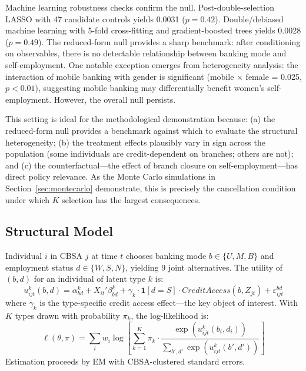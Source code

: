 \documentclass[12pt]{article}
\begin{document}
Machine learning robustness checks confirm the null. Post-double-selection LASSO \citep{belloni2014} with 47 candidate controls yields 0.0031 ($p = 0.42$). Double/debiased machine learning \citep{chernozhukov2018dml} with 5-fold cross-fitting and gradient-boosted trees yields 0.0028 ($p = 0.49$). The reduced-form null provides a sharp benchmark: after conditioning on observables, there is no detectable relationship between banking mode and self-employment. One notable exception emerges from heterogeneity analysis: the interaction of mobile banking with gender is significant (mobile $\times$ female = 0.025, $p < 0.01$), suggesting mobile banking may differentially benefit women's self-employment. However, the overall null persists.

This setting is ideal for the methodological demonstration because: (a) the reduced-form null provides a benchmark against which to evaluate the structural heterogeneity; (b) the treatment effects plausibly vary in sign across the population (some individuals are credit-dependent on branches; others are not); and (c) the counterfactual---the effect of branch closure on self-employment---has direct policy relevance. As the Monte Carlo simulations in Section~\ref{sec:montecarlo} demonstrate, this is precisely the cancellation condition under which $K$ selection has the largest consequences.

\subsection{Structural Model}

Individual $i$ in CBSA $j$ at time $t$ chooses banking mode $b \in \{U, M, B\}$ and employment status $d \in \{W, S, N\}$, yielding 9 joint alternatives. The utility of $(b, d)$ for an individual of latent type $k$ is:
\begin{equation}
u_{ijt}^k(b,d) = \alpha_{bd}^k + X_{it}'\beta_{bd}^k + \gamma_k \cdot \mathbf{1}[d = S] \cdot CreditAccess(b, Z_{jt}) + \varepsilon_{ijt}^{bd}
\label{eq:utility}
\end{equation}
where $\gamma_k$ is the type-specific credit access effect---the key object of interest. With $K$ types drawn with probability $\pi_k$, the log-likelihood is:
\begin{equation}
\ell(\theta, \pi) = \sum_{i} w_i \log \left[ \sum_{k=1}^{K} \pi_k \cdot \frac{\exp(u_{ijt}^k(b_i, d_i))}{\sum_{b',d'} \exp(u_{ijt}^k(b', d'))} \right]
\end{equation}
Estimation proceeds by EM with CBSA-clustered standard errors.
\end{document}
